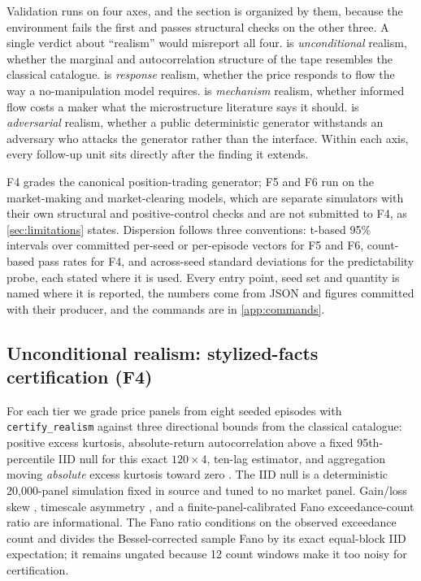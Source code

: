 Validation runs on four axes, and the section is organized by them, because the environment fails the first and passes structural checks on the other three. A single verdict about ``realism'' would misreport all four.  is \emph{unconditional} realism, whether the marginal and autocorrelation structure of the tape resembles the classical catalogue.  is \emph{response} realism, whether the price responds to flow the way a no-manipulation model requires.  is \emph{mechanism} realism, whether informed flow costs a maker what the microstructure literature says it should.  is \emph{adversarial} realism, whether a public deterministic generator withstands an adversary who attacks the generator rather than the interface. Within each axis, every follow-up unit sits directly after the finding it extends.

F4 grades the canonical position-trading generator; F5 and F6 run on the market-making and market-clearing models, which are separate simulators with their own structural and positive-control checks and are not submitted to F4, as \cref{sec:limitations} states. Dispersion follows three conventions: t-based 95\% intervals over committed per-seed or per-episode vectors for F5 and F6, count-based pass rates for F4, and across-seed standard deviations for the predictability probe, each stated where it is used. Every entry point, seed set and quantity is named where it is reported, the numbers come from JSON and figures committed with their producer, and the commands are in \cref{app:commands}.

\subsection{Unconditional realism: stylized-facts certification (F4)}\label{sec:f4}

For each tier we grade price panels from eight seeded episodes with \texttt{certify\_realism} against three directional bounds from the classical catalogue: positive excess kurtosis, absolute-return autocorrelation above a fixed 95th-percentile IID null for this exact $120\times4$, ten-lag estimator, and aggregation moving \emph{absolute} excess kurtosis toward zero \citep{cont2001empirical}. The IID null is a deterministic 20{,}000-panel simulation fixed in source and tuned to no market panel. Gain/loss skew \citep{cont2001empirical}, timescale asymmetry \citep{zumbach2009time}, and a finite-panel-calibrated Fano exceedance-count ratio are informational. The Fano ratio conditions on the observed exceedance count and divides the Bessel-corrected sample Fano by its exact equal-block IID expectation; it remains ungated because 12 count windows make it too noisy for certification.

